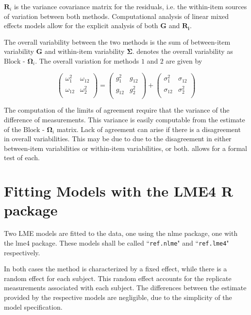 $\boldsymbol{R}_{i}$ is the variance covariance matrix for the residuals, i.e. the within-item sources of variation between both methods. Computational analysis of linear mixed effects models allow for the explicit analysis of both $\boldsymbol{G}$ and $\boldsymbol{R_i}$.

The overall variability between the two methods is the sum of between-item variability
$\boldsymbol{G}$ and within-item variability $\boldsymbol{\Sigma}$. \citet{ARoy2009} denotes the overall variability
as ${\mbox{Block - }\boldsymbol \Omega_{i}}$. The overall variation for methods $1$ and $2$ are given by

\begin{center}
\[\left(\begin{array}{cc}
\omega^2_1  & \omega_{12} \\
\omega_{12} & \omega^2_2 \\
\end{array}  \right)
=  \left(
\begin{array}{cc}
g^2_1  & g_{12} \\
g_{12} & g^2_2 \\
\end{array} \right)+
\left(
\begin{array}{cc}
\sigma^2_1  & \sigma_{12} \\
\sigma_{12} & \sigma^2_2 \\
\end{array}\right)
\]
\end{center}
The computation of the limits of agreement require that the variance of the difference of measurements. This variance is easily computable from the estimate of the ${\mbox{Block - }\boldsymbol \Omega_{i}}$ matrix. Lack of agreement can arise if there is a disagreement in overall variabilities. This may be due to due to the disagreement in either between-item variabilities or within-item variabilities, or both. \citet{ARoy2009} allows for a formal test of each.


\section{Fitting Models with the LME4 R package}
Two LME models are fitted to the data, one using the nlme package, one with the lme4 package. These models shall be called ``\texttt{ref.nlme}" and ``\texttt{ref.lme4}" respectively.

In both cases the method is characterized by a fixed effect, while there is a random effect for each subject. This random effect accounts for the replicate measurements associated with each subject. The differences between the estimate provided by the respective models are negligible, due to the simplicity of the model specification.

